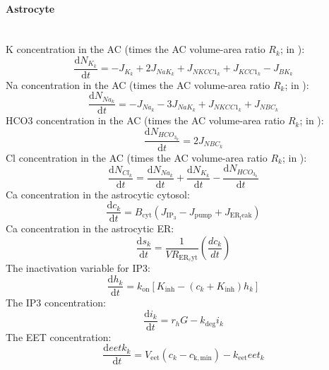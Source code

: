 \paragraph{Astrocyte}~\\
%
\gls{K} concentration in the AC  (times the AC volume-area ratio $R_k$; in \uMm):
\begin{equation} \label{eq:KInt}
\dfrac{\mathrm{d}N_{K_k}}{\mathrm{d}t}=- J_{K_k} + 2 J_{NaK_{k}} + J_{NKCC1_{k}} +  J_{KCC1_{k}}
- J_{BK_k}  
\end{equation}
%
\gls{Na} concentration in the AC  (times the AC volume-area ratio $R_k$; in \uMm):
\begin{equation} \label{eq:NaInt}
\dfrac{\mathrm{d}N_{Na_k}}{\mathrm{d}t}=-J_{Na_k} - 3 J_{NaK_{k}} + J_{NKCC1_{k}} +  J_{NBC_{k}}
\end{equation}
%
\gls{HCO3} concentration in the AC  (times the AC volume-area ratio $R_k$; in \uMm):
\begin{equation} \label{eq:HCOInt}
\dfrac{\mathrm{d}N_{HCO_{3_k}}}{\mathrm{d}t}= 2 J_{NBC_{k}} 
\end{equation}
%
\gls{Cl} concentration in the AC  (times the AC volume-area ratio $R_k$; in \uMm):
\begin{equation} \label{eq:ClInt}
\dfrac{\mathrm{d}N_{Cl_k}}{\mathrm{d}t}= \dfrac{\mathrm{d}N_{Na_k}}{\mathrm{d}t} + \dfrac{\mathrm{d}N_{K_k}}{\mathrm{d}t} - \dfrac{\mathrm{d}N_{HCO_{3_{k}}}}{\mathrm{d}t}
\end{equation}
%
\gls{Ca} concentration in the astrocytic cytosol:
\begin{equation} \label{eq:ckInt}
\dfrac{\mathrm{d}c_k}{\mathrm{d}t}= B_{\mathrm{cyt}}(J_{\mathrm{IP_3}}-J_{\mathrm{pump}}+J_{\mathrm{ER_leak}})
\end{equation}
%
\gls{Ca} concentration in the astrocytic \gls{ER}:
\begin{equation} \label{eq:skInt}
\dfrac{\mathrm{d}s_k}{\mathrm{d}t}= \frac{1}{VR_{\mathrm{ER_cyt}}}(\frac{dc_k}{dt})
\end{equation}
%
The inactivation variable for \gls{IP3}:
\begin{equation} \label{eq:hkInt}
\dfrac{\mathrm{d}h_k}{\mathrm{d}t}= k_{\mathrm{on}}[K_{\mathrm{inh}}-(c_k+K_{\mathrm{inh}})h_k]
\end{equation}
%
The \gls{IP3} concentration:
\begin{equation} \label{eq:ikInt}
\dfrac{\mathrm{d}i_k}{\mathrm{d}t}= r_hG-k_{\mathrm{deg}}i_k
\end{equation}
%
The EET concentration:
\begin{equation} \label{eq:eetkInt}
\dfrac{\mathrm{d}eetk_k}{\mathrm{d}t}= V_{\mathrm{eet}}(c_k-c_{\mathrm{k,min}})-k_{\mathrm{eet}}eet_k
\end{equation}
